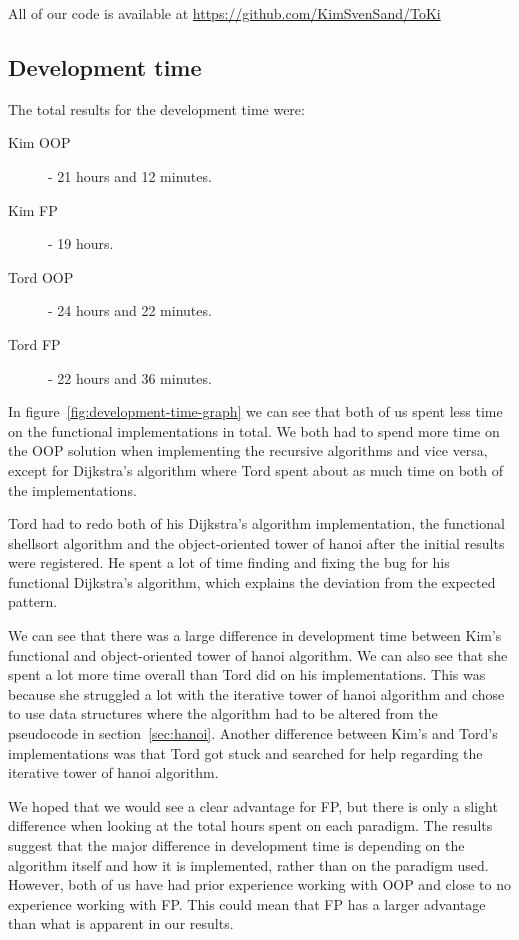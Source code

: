 \documentclass {article}
\begin{document}
All of our code is available at \url{https://github.com/KimSvenSand/ToKi}
\subsection{Development time}
\label{sec:development-time}
The total results for the development time were:
\begin{description}
\item[Kim OOP] - 21 hours and 12 minutes.
\item[Kim FP] - 19 hours.
\item[Tord OOP] - 24 hours and 22 minutes.
\item[Tord FP] - 22 hours and 36 minutes.
\end{description}

In figure~\ref{fig:development-time-graph} we can see that both of us spent less time on the functional implementations in total. We both had to spend more time on the OOP solution when implementing the recursive algorithms and vice versa, except for Dijkstra's algorithm where Tord spent about as much time on both of the implementations. 

Tord had to redo both of his Dijkstra's algorithm implementation, the functional shellsort algorithm and the object-oriented tower of hanoi after the initial results were registered. He spent a lot of time finding and fixing the bug for his functional Dijkstra's algorithm, which explains the deviation from the expected pattern.

We can see that there was a large difference in development time between Kim's functional and object-oriented tower of hanoi algorithm. We can also see that she spent a lot more time overall than Tord did on his implementations. This was because she struggled a lot with the iterative tower of hanoi algorithm and chose to use data structures where the algorithm had to be altered from the pseudocode in section~\ref{sec:hanoi}. Another difference between Kim's and Tord's implementations was that Tord got stuck and searched for help regarding the iterative tower of hanoi algorithm.

We hoped that we would see a clear advantage for FP, but there is only a slight difference when looking at the total hours spent on each paradigm. The results suggest that the major difference in development time is depending on the algorithm itself and how it is implemented, rather than on the paradigm used. However, both of us have had prior experience working with OOP and close to no experience working with FP. This could mean that FP has a larger advantage than what is apparent in our results. 
\end{document}
